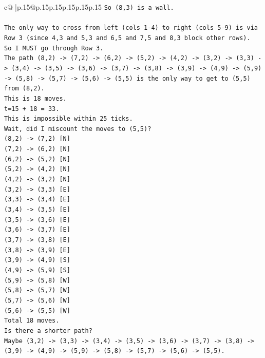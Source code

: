 \documentclass{article}
\begin{document}
{\begin{supertabular}{c@{$\;$}|p{.15\linewidth}@{}p{.15\linewidth}p{.15\linewidth}p{.15\linewidth}p{.15\linewidth}p{.15\linewidth}}
{{{\texttt{So (8,3) is a wall.} \\
\\ 
\texttt{The only way to cross from left (cols 1{-}4) to right (cols 5{-}9) is via Row 3 (since 4,3 and 5,3 and 6,5 and 7,5 and 8,3 block other rows).} \\
\texttt{So I MUST go through Row 3.} \\
\texttt{The path (8,2) {-}> (7,2) {-}> (6,2) {-}> (5,2) {-}> (4,2) {-}> (3,2) {-}> (3,3) {-}> (3,4) {-}> (3,5) {-}> (3,6) {-}> (3,7) {-}> (3,8) {-}> (3,9) {-}> (4,9) {-}> (5,9) {-}> (5,8) {-}> (5,7) {-}> (5,6) {-}> (5,5) is the only way to get to (5,5) from (8,2).} \\
\texttt{This is 18 moves.} \\
\texttt{t=15 + 18 = 33.} \\
\texttt{This is impossible within 25 ticks.} \\
\texttt{Wait, did I miscount the moves to (5,5)?} \\
\texttt{(8,2) {-}> (7,2) {[}N{]}} \\
\texttt{(7,2) {-}> (6,2) {[}N{]}} \\
\texttt{(6,2) {-}> (5,2) {[}N{]}} \\
\texttt{(5,2) {-}> (4,2) {[}N{]}} \\
\texttt{(4,2) {-}> (3,2) {[}N{]}} \\
\texttt{(3,2) {-}> (3,3) {[}E{]}} \\
\texttt{(3,3) {-}> (3,4) {[}E{]}} \\
\texttt{(3,4) {-}> (3,5) {[}E{]}} \\
\texttt{(3,5) {-}> (3,6) {[}E{]}} \\
\texttt{(3,6) {-}> (3,7) {[}E{]}} \\
\texttt{(3,7) {-}> (3,8) {[}E{]}} \\
\texttt{(3,8) {-}> (3,9) {[}E{]}} \\
\texttt{(3,9) {-}> (4,9) {[}S{]}} \\
\texttt{(4,9) {-}> (5,9) {[}S{]}} \\
\texttt{(5,9) {-}> (5,8) {[}W{]}} \\
\texttt{(5,8) {-}> (5,7) {[}W{]}} \\
\texttt{(5,7) {-}> (5,6) {[}W{]}} \\
\texttt{(5,6) {-}> (5,5) {[}W{]}} \\
\texttt{Total 18 moves.} \\
\texttt{Is there a shorter path?} \\
\texttt{Maybe (3,2) {-}> (3,3) {-}> (3,4) {-}> (3,5) {-}> (3,6) {-}> (3,7) {-}> (3,8) {-}> (3,9) {-}> (4,9) {-}> (5,9) {-}> (5,8) {-}> (5,7) {-}> (5,6) {-}> (5,5).} \\
}}}
\end{supertabular}}
\end{document}
